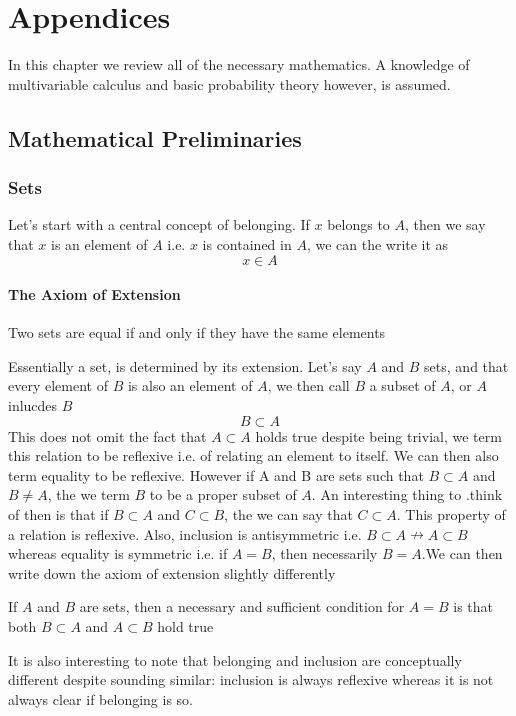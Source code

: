 \chapter*{Appendices}
\setcounter{section}{0}

\renewcommand{\thesection}{\Alph{section}}
In this chapter we review all of the necessary mathematics. A knowledge of multivariable calculus and basic probability theory however, is assumed.\section{Mathematical Preliminaries}
\label{appendix_a}
\subsection{Sets}
Let's start with a central concept of belonging. If $x$ belongs to $A$, then we say that $x$ is an element of $A$ i.e. $x$ is contained in $A$, we can the write it as 
\begin{equation}
    x \in A
\end{equation}
\subsubsection{The Axiom of Extension}
\begin{tcolorbox}
    Two sets are equal if and only if they have the same elements
\end{tcolorbox}
Essentially a set, is determined by its extension. Let's say $A$ and $B$ sets, and that every element of $B$ is also an element of $A$, we then call $B$ a subset of $A$, or $A$ inlucdes $B$
\begin{equation}
    B \subset A
\end{equation}
This does not omit the fact that $A \subset A$ holds true despite being trivial, we term this relation to be reflexive i.e. of relating an element to itself. We can then also term equality to be reflexive. However if A and B are sets such that $B \subset A$ and $B \neq A$, the we term $B$ to be a proper subset of $A$. An interesting thing to .think of then is that if $B \subset A$ and $C \subset B$, the we can say that $C \subset A$. This property of a relation is reflexive. Also, inclusion is antisymmetric i.e. $B \subset A \nrightarrow A \subset B$ whereas equality is symmetric i.e. if $A = B$, then necessarily $B =A$.We can then write down the axiom of extension slightly differently
\begin{tcolorbox}
If $A$ and $B$ are sets, then a necessary and sufficient condition for $A = B$ is that both $B \subset A$ and $A \subset B$ hold true
\end{tcolorbox}
It is also interesting to note that belonging and inclusion are conceptually different despite sounding similar: inclusion is always reflexive whereas it is not always clear if belonging is so.
